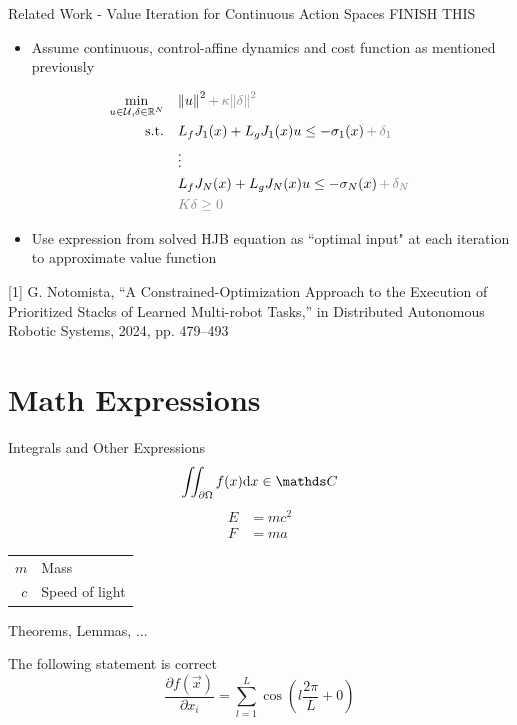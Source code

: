 \begin{frame}{Related Work - Value Iteration for Continuous Action Spaces}
	FINISH THIS
	\begin{itemize}
		\item{Assume continuous, control-affine dynamics and cost function as mentioned previously}
	\end{itemize}
	\begin{align*}
		\min_{u \in \mathcal{U}, \delta \in \mathbb{R}^N} \quad & { \lVert u \rVert }^2 \, { \color{gray} + \, \kappa { \lVert \delta \rVert }^2 } \\
		\textrm{s.t.} \quad & L_f {J}_1 (x) + L_g {J}_1 (x) u \le - \sigma_1(x) \, {\color{gray} + \, \delta_1 } \\
                \quad & \vdots \\
		\quad & L_f {J}_N (x) + L_g {J}_N (x) u \le - \sigma_N(x) \, {\color{gray} + \, \delta_N } \\
		\quad & { \color{gray} K \delta \ge 0 }
	\end{align*}
	\begin{itemize}
		\item{Use expression from solved HJB equation as ``optimal input" at each iteration to approximate value function}
	\end{itemize}
	\seprule
	\footnotesize{[1] G. Notomista, “A Constrained-Optimization Approach to the Execution of Prioritized Stacks of Learned Multi-robot Tasks,” in Distributed Autonomous Robotic Systems, 2024, pp. 479–493}
\end{frame}




\section{Math Expressions}
\begin{frame}{Integrals and Other Expressions}
	\begin{equation}
		\iint_{\partial\Omega}f(x)\diff{x} \in \complexes
	\end{equation}
	\begin{align}
		E &= mc^2\\
		F &= ma
	\end{align}

	\seprule
	
	\begin{tabular}{rl}
		$m$ & Mass\\
		$c$ & Speed of light
	\end{tabular}
\end{frame}
\begin{frame}{Theorems, Lemmas, ...}
	\begin{thm}
		The following statement is correct
		\begin{equation}
			\frac{\partial f(\vec{x})}{\partial x_i} = \sum_{l=1}^{L}\cos\left(l\frac{2\pi}{L} + 0\right)
		\end{equation}
	\end{thm}
\end{frame}

